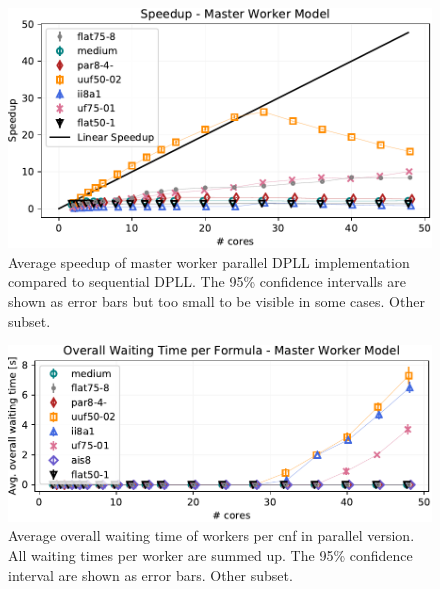 \documentclass[letterpaper]{article}
\begin{document}
\begin{figure}[h]
    \centering
    \includegraphics[width=\columnwidth]{figures/scaling_parallel_non_subset_dpll_scaling_tar.pdf}
    \caption{Average speedup of master worker parallel DPLL implementation compared to sequential DPLL.
    The 95\% confidence intervalls are shown as error bars but too small to be visible in some cases.
    Other subset.}
    \label{fig:dpll_parallel_speedup_non}
\end{figure}

\begin{figure}[h]
    \centering
    \includegraphics[width=\columnwidth]{figures/waiting_parallel_non_subset_dpll_scaling_tar.pdf}
    \caption{Average overall waiting time of workers per cnf in parallel version.
    All waiting times per worker are summed up.
    The 95\% confidence interval are shown as error bars.
    Other subset.}
    \label{fig:dpll_parallel_waiting_non}
\end{figure}
\end{document}

